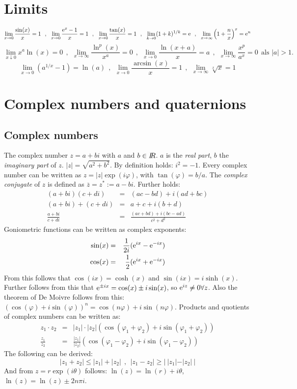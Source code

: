 \documentclass[a4paper,fancyheadings,twoside]{report}
\begin{document}
\section{Limits}
\[
\lim_{x\rightarrow0}\frac{\sin(x)}{x}=1~~,~~
\lim_{x\rightarrow0}\frac{{\rm e}^x-1}{x}=1~~,~~
\lim_{x\rightarrow0}\frac{\tan(x)}{x}=1~~,~~
\lim_{k\rightarrow0}(1+k)^{1/k}={\rm e}~~,~~
\lim_{x\rightarrow\infty}\left(1+\frac{n}{x}\right)^x={\rm e}^n
\]
\[
\lim_{x\downarrow0}x^a\ln(x)=0~~,~~
\lim_{x\rightarrow\infty}\frac{\ln^p(x)}{x^a}=0~~,~~
\lim_{x\rightarrow0}\frac{\ln(x+a)}{x}=a~~,~~
\lim_{x\rightarrow\infty}\frac{x^p}{a^x}=0~~\mbox{als }|a|>1.
\]
\[
\lim_{x\rightarrow0}\left(a^{1/x}-1\right)=\ln(a)~~,~~
\lim_{x\rightarrow0}\frac{\arcsin(x)}{x}=1~~,~~
\lim_{x\rightarrow\infty}\sqrt[x]{x}=1
\]

\section{Complex numbers and quaternions}
\subsection{Complex numbers}
The complex number $z=a+bi$ with $a$ and $b\in I\hspace{-1mm}R$. $a$ is the {\it real part},
$b$ the {\it imaginary part} of $z$. $|z|=\sqrt{a^2+b^2}$. By definition
holds: $i^2=-1$. Every complex number can be written as $z=|z|\exp(i\varphi)$,
with $\tan(\varphi)=b/a$. The {\it complex conjugate} of $z$ is defined as
$\overline{z}=z^*:=a-bi$. Further holds:
\begin{eqnarray*}
(a+bi)(c+di)&=&(ac-bd)+i(ad+bc)\\
(a+bi)+(c+di)&=&a+c+i(b+d)\\
\frac{a+bi}{c+di}&=&\frac{(ac+bd)+i(bc-ad)}{c^2+d^2}
\end{eqnarray*}
Goniometric functions can be written as complex exponents:
\begin{eqnarray*}
\sin(x)&=&\frac{1}{2i}({\rm e}^{ix}-{\rm e}^{-ix})\\
\cos(x)&=&\frac{1}{2}({\rm e}^{ix}+{\rm e}^{-ix})
\end{eqnarray*}
From this follows that $\cos(ix)=\cosh(x)$ and $\sin(ix)=i\sinh(x)$.
Further follows from this that\newline
${\rm e}^{\pm ix}=\cos(x)\pm i\sin(x)$, so
${\rm e}^{iz}\neq0\forall z$. Also the theorem of De Moivre follows from
this:\\ $(\cos(\varphi)+i\sin(\varphi))^n=\cos(n\varphi)+i\sin(n\varphi)$.
\npar
Products and quotients of complex numbers can be written as:
\begin{eqnarray*}
z_1\cdot z_2&=&|z_1|\cdot|z_2|(\cos(\varphi_1+\varphi_2)+i\sin(\varphi_1+\varphi_2))\\
\frac{z_1}{z_2}&=&\frac{|z_1|}{|z_2|}(\cos(\varphi_1-\varphi_2)+i\sin(\varphi_1-\varphi_2))
\end{eqnarray*}
The following can be derived:
\[
|z_1+z_2|\leq|z_1|+|z_2|~~,~~|z_1-z_2|\geq|~|z_1|-|z_2|~|
\]
And from $z=r\exp(i\theta)$ follows: $\ln(z)=\ln(r)+i\theta$, $\ln(z)=\ln(z)\pm2n\pi i$.
\end{document}
